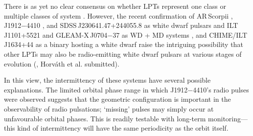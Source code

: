 \documentclass[fleqn,usenatbib]{mnras}
\begin{document}


There is as yet no clear consensus on whether LPTs represent one class or multiple classes of system \citep[e.g.][]{2024ApJ...961..214R}.
However, the recent confirmation of AR\,Scorpii \citep{2016Natur.537..374M}, J1912$-$4410 \citep{2023NatAs...7..931P}, and SDSS\,J230641.47+244055.8 \citep{2025arXiv250620455C} as white dwarf pulsars and ILT\,J1101+5521 and GLEAM-X\,J0704$-$37 as WD + MD systems \citep{deRuiter2025,2025A&A...695L...8R}, and CHIME/ILT J1634+44 as a binary hosting a white dwarf \citep[possibly two,][]{2025arXiv250705139D,2025arXiv250705078B} raise the intriguing possibility that other LPTs may also be radio-emitting white dwarf pulsars at various stages of evolution (\citealt{2021NatAs...5..648S}, Horv\'{a}th et al. submitted).

In this view, the intermittency of these systems have several possible explanations.
The limited orbital phase range in which J1912$-$4410's radio pulses were observed suggests that the geometric configuration is important in the observability of radio pulsations; `missing' pulses may simply occur at unfavourable orbital phases.
This is readily testable with long-term monitoring---this kind of intermittency will have the same periodicity as the orbit itself.
\end{document}
